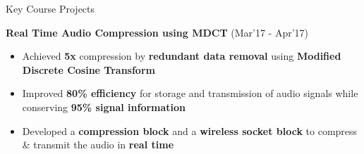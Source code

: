 \documentclass{resume}
\newcommand{\sepval}{-0.5em}
\begin{document}
\begin{rSection}{Key Course Projects}
%
%
%
% 	
% 	
%
%



\vspace{-0.1cm}

\item {\bf{Real Time Audio Compression using MDCT}} \hfill{(Mar'17 - Apr'17)}\\
[-0.4cm]

\begin{itemize}[leftmargin=*]

	\itemsep \sepval

	\item Achieved {\bf 5x} compression by {\bf redundant data removal} using {\bf{Modified Discrete Cosine Transform}}

	\item Improved {\bf 80\% efficiency} for storage and transmission of audio signals while conserving {\bf 95\% signal information}

	\item Developed a {\bf compression block} and a {\bf wireless socket block} to compress \& transmit the audio in {\bf real time}

\end{itemize}


\end{rSection}
\end{document}
